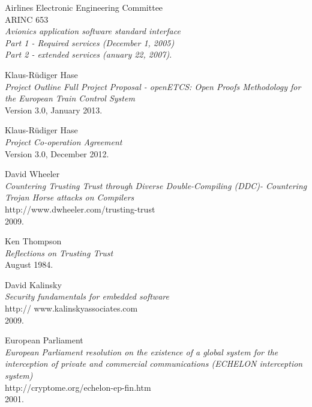 \documentclass{template/openetcs_report}
\begin{document}
\begin{thebibliography}{99}
  Airlines Electronic Engineering Committee\\ARINC 653\\
  \emph{Avionics application software standard interface\\ 
Part 1 - Required services (December 1, 2005)\\
Part 2 - extended services (anuary 22, 2007)}.

  Klaus-R{\"u}diger Hase\\
  \emph{Project Outline Full Project Proposal - openETCS: Open Proofs Methodology for the European Train Control System}\\
  Version 3.0,
  January 2013.

  Klaus-R{\"u}diger Hase\\
  \emph{Project Co-operation Agreement}\\
  Version 3.0,
  December 2012.

  David Wheeler\\
  \emph{Countering Trusting Trust through Diverse Double-Compiling (DDC)- Countering Trojan Horse attacks on Compilers}\\
  http://www.dwheeler.com/trusting-trust\\
  2009.

  Ken Thompson\\
  \emph{Reflections on Trusting Trust}\\
  August 1984.

  David Kalinsky\\
  \emph{Security fundamentals for embedded software}\\
  http:// www.kalinskyassociates.com\\
  2009.

  European Parliament\\
  \emph{ European Parliament resolution on the existence of a global system for the interception of private and commercial communications (ECHELON interception system)}\\
  http://cryptome.org/echelon-ep-fin.htm\\
  2001.

  
\end{thebibliography}

\end{document}

